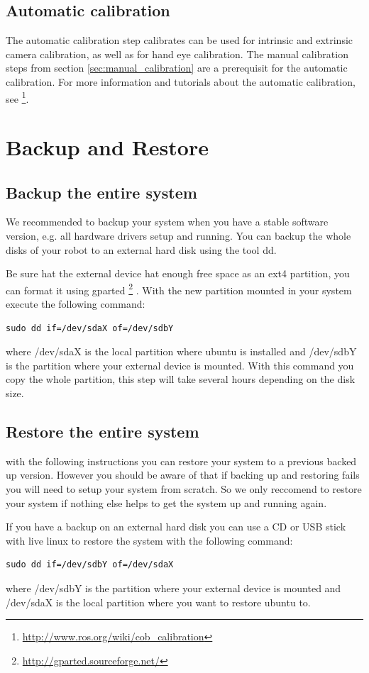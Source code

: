 \subsection{Automatic calibration}
The automatic calibration step calibrates can be used for intrinsic and extrinsic camera calibration, as well as for hand eye calibration. The manual calibration steps from section \ref{sec:manual_calibration} are a prerequisit for the automatic calibration. For more information and tutorials about the automatic calibration, see \footnote{\url{http://www.ros.org/wiki/cob_calibration}}.

\section{Backup and Restore} 
\subsection{Backup the entire system}  
We recommended to backup your system when you have a stable software version, e.g. all hardware drivers setup and running. You can backup the whole disks of your robot to an external hard disk using the tool dd.

Be sure hat the external device hat enough free space as an ext4 partition, you can format it using gparted \footnote{\url{http://gparted.sourceforge.net/}} . With the new partition mounted in your system execute the following command:
\begin{lstlisting}
sudo dd if=/dev/sdaX of=/dev/sdbY
\end{lstlisting}
where /dev/sdaX is the local partition where ubuntu is installed and /dev/sdbY is the partition where your external device is mounted. With this command you copy the whole partition, this step will take several hours depending on the disk size.

\subsection{Restore the entire system}
with the following instructions you can restore your system to a previous backed up version. However you should be aware of that if backing up and restoring fails you will need to setup your system from scratch. So we only reccomend to restore your system if nothing else helps to get the system up and running again. 

If you have a backup on an external hard disk you can use a CD or USB stick with live linux to restore the system with the following command:
\begin{lstlisting}
sudo dd if=/dev/sdbY of=/dev/sdaX
\end{lstlisting}
where /dev/sdbY is the partition where your external device is mounted and /dev/sdaX is the local partition where you want to restore ubuntu to.


